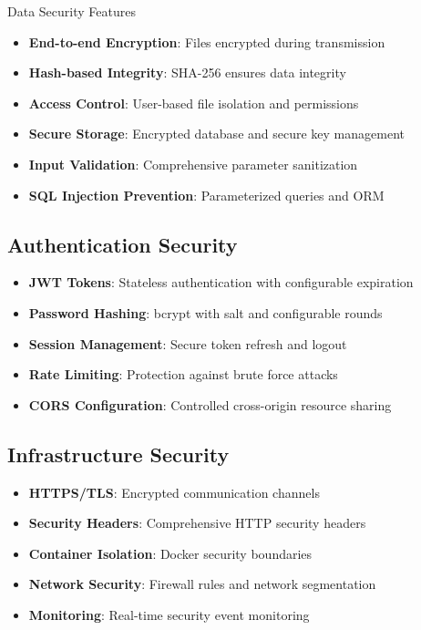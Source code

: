 \documentclass[11pt,a4paper]{article}
\begin{document}
\begin{securitybox}{\faShieldAlt\space Data Security Features}
\begin{itemize}
    \item \textbf{End-to-end Encryption}: Files encrypted during transmission
    \item \textbf{Hash-based Integrity}: SHA-256 ensures data integrity
    \item \textbf{Access Control}: User-based file isolation and permissions
    \item \textbf{Secure Storage}: Encrypted database and secure key management
    \item \textbf{Input Validation}: Comprehensive parameter sanitization
    \item \textbf{SQL Injection Prevention}: Parameterized queries and ORM
\end{itemize}
\end{securitybox}

\subsection{Authentication Security}

\begin{itemize}
    \item \textbf{JWT Tokens}: Stateless authentication with configurable expiration
    \item \textbf{Password Hashing}: bcrypt with salt and configurable rounds
    \item \textbf{Session Management}: Secure token refresh and logout
    \item \textbf{Rate Limiting}: Protection against brute force attacks
    \item \textbf{CORS Configuration}: Controlled cross-origin resource sharing
\end{itemize}

\subsection{Infrastructure Security}

\begin{itemize}
    \item \textbf{HTTPS/TLS}: Encrypted communication channels
    \item \textbf{Security Headers}: Comprehensive HTTP security headers
    \item \textbf{Container Isolation}: Docker security boundaries
    \item \textbf{Network Security}: Firewall rules and network segmentation
    \item \textbf{Monitoring}: Real-time security event monitoring
\end{itemize}
\end{document}
